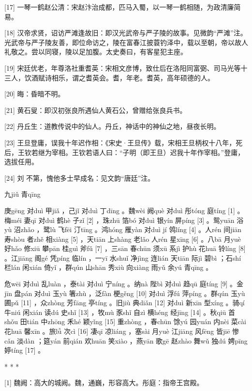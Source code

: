 \documentclass[12pt,UTF8]{ctexbook}
\begin{document}
[17] 一琴一鹤赵公清：宋赵汴治成都，匹马入蜀，以一琴一鹤相随，为政清廉简易。

[18] 汉帝求贤，诏访严滩逢故旧：即汉光武帝与严子陵的故事。见微韵“严滩”注。光武帝与严子陵友善，即位命访之，陵在富春江披蓑钓泽中，载以至朝，帝以故人礼敬之。尝以同寝，陵以足加腹。太史奏曰，有客星犯主座。

[19] 宋廷优老，年尊洛社重耆英：宋相文彦博，致仕后在洛阳同富弼、司马光等十三人，饮酒赋诗相乐，谓之耆英会。耆，年老。耆英，高年硕德的人。

[20] 晦：昏暗不明。

[21] 黄石叟：即汉初张良所遇仙人黄石公，曾赠给张良兵书。

[22] 丹丘生：道教传说中的仙人。丹丘，神话中的神仙之地，昼夜长明。

[23] 王旦登庸，误我十年迟作相：《宋史·王旦传》载，宋相王旦柄权十八年，死后，王钦若继为宰相。王钦若语人曰：“子明（即王旦）迟我十年作宰相。”登庸，选拔任用。

[24] 刘 不第，愧他多士早成名：见文韵“唐廷”注。





九jiǔ 青qīng


庚gēng 对duì 甲jiǎ ，己jǐ 对duì 丁dīng 。魏wèi 阙què 对duì 彤tóng 庭tíng [1] 。梅méi 妻qī 对duì 鹤hè 子zǐ [2] ，珠zhū 箔bó 对duì 银yín 屏píng [3] 。鸳yuān 浴yù 沼zhǎo ，鹭lù 飞fēi 汀tīng 。鸿hóng 雁yàn 对duì jí 鸰líng [4] 。人rén 间jiān 寿shòu 者zhě 相xiàng [5] ，天tiān 上shàng 老lǎo 人rén 星xīng [6] 。八bā 月yuè 好hǎo 修xiū 攀pān 桂guì 斧fǔ [7] ，三sān 春chūn 须xū 系jì 护hù 花huā 铃líng [8] 。江jiāng 阁gé 凭píng 临lín ，一yī 水shuǐ 净jìng 连lián 天tiān 际jì 碧bì ；石shí 栏lán 闲xián 倚yǐ ，群qún 山shān 秀xiù 向xiàng 雨yǔ 余yú 青qīng 。

危wēi 对duì 乱luàn ，泰tài 对duì 宁níng 。纳nà 陛bì 对duì 趋qū 庭tíng [9] 。金jīn 盘pán 对duì 玉yù 箸zhù ，泛fàn 梗gěng [10] 对duì 浮fú 萍píng 。群qún 玉yù 圃pǔ [11] ，众zhòng 芳fāng 亭tíng 。旧jiù 典diǎn [12] 对duì 新xīn 型xíng 。骑qí 牛niú 闲xián 读dú 史shǐ [13] ，牧mù 豕shǐ 自zì 横héng 经jīng [14] 。秋qiū 首shǒu 田tián 中zhōng 禾hé 颖yǐng [15] 重zhòng ，春chūn 馀yú 园yuán 内nèi 菜cài 花huā 馨xīn 。旅lǚ 次cì [16] 凄qī 凉liáng ，塞sài 月yuè 江jiāng 风fēng 皆jiē 惨cǎn 淡dàn ；筵yán 前qián 欢huān 笑xiào ，燕yān 歌gē 赵zhào 舞wǔ 独dú 娉pīng 婷tíng [17] 。



* * *



[1] 魏阙：高大的城阙。魏，通巍，形容高大。彤庭：指帝王宫殿。
\end{document}
